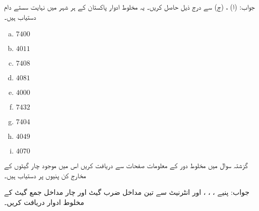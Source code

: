 جواب: (ا) ، (ج) 
 سے درج ذیل حاصل کریں۔ یہ مخلوط ادوار پاکستان کے ہر شہر میں نہایت سستے دام  دستیاب ہیں۔
\begin{multicols}{5}
\begin{enumerate}[a.]
\item
 \( 7400 \) 
 \item
  \( 4011  \)
  \item
  \( 7408  \)
  \item
  \(  4081  \)
  \item
  \( 4000  \)
  \item
  \( 7432  \)
  \item
  \( 7404  \)
  \item
  \( 4049  \)
  \item
  \( 4070  \)
\end{enumerate}
\end{multicols}
گزشتہ سوال میں  مخلوط دور  کے  معلومات صفحات سے   دریافت کریں اس میں موجود  چار گیٹوں کے مخارج کن پنیوں پر دستیاب ہیں۔

جواب: پنیے ، ، ، اور 
انٹرنیٹ سے تین مداخل  ضرب گیٹ اور چار مداخل جمع گیٹ کے مخلوط ادوار دریافت کریں۔

